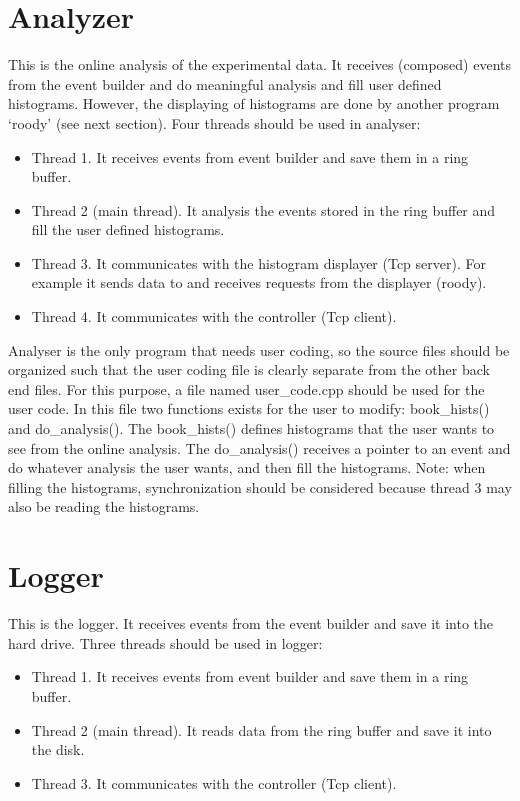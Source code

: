 \documentclass[a4paper,12pt]{article}
\begin{document}
	\section{Analyzer}
	This is the online analysis of the experimental data. It receives
	(composed) events from the event builder and do meaningful analysis and
	fill user defined histograms. However, the displaying of histograms are
	done by another program `roody' (see next section).
	Four threads should be used in analyser:
	\begin{itemize}
		\item Thread 1. It receives events from event builder and save them
			in a ring buffer.
		\item Thread 2 (main thread). It analysis the events stored in the
			ring buffer and fill the user defined histograms.
		\item Thread 3. It communicates with the histogram displayer (Tcp
			server). For example it sends data to and receives requests from
			the displayer (roody).
		\item Thread 4. It communicates with the controller (Tcp client).
	\end{itemize}
	Analyser is the only program that needs user coding, so the source files
	should be organized such that the user coding file is clearly separate
	from the other back end files. For this purpose, a file named
	user\_code.cpp should be used for the user code. In this file two
	functions exists for the user to modify: book\_hists() and
	do\_analysis(). The  book\_hists() defines histograms that the user
	wants to see from the online analysis. The do\_analysis() receives a
	pointer to an event and do whatever analysis the user wants, and then
	fill the histograms. Note: when filling the histograms, synchronization
	should be considered because thread 3 may also be reading the
	histograms.

	\section{Logger}
	This is the logger. It receives
	events from the event builder and save it into the hard drive.
	Three threads should be used in logger:
	\begin{itemize}
		\item Thread 1. It receives events from event builder and save them
			in a ring buffer.
		\item Thread 2 (main thread). It reads data from the ring buffer and
			save it into the disk.
		\item Thread 3. It communicates with the controller (Tcp client).
	\end{itemize}
\end{document}
